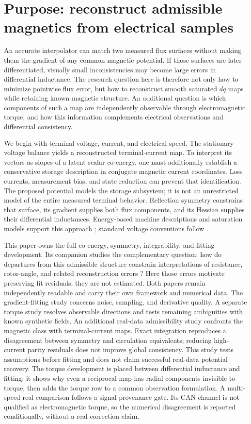 \section{Purpose: reconstruct admissible magnetics from electrical samples}
An accurate interpolator can match two measured flux surfaces without making
them the gradient of any common magnetic potential. If those surfaces are
later differentiated, visually small inconsistencies may become large errors
in differential inductance. The research question here is therefore not only
how to minimize pointwise flux error, but how to reconstruct smooth saturated
$dq$ maps while retaining known magnetic structure.
An additional question is which components of such a map are independently
observable through electromagnetic torque, and how this information
complements electrical observations and differential consistency.

We begin with terminal voltage, current, and electrical speed. The stationary
voltage balance yields a reconstructed terminal-current map. To interpret
its vectors as slopes of a latent scalar co-energy, one must additionally
establish a conservative storage description in conjugate magnetic current
coordinates. Loss currents, measurement bias, and state reduction can prevent
that identification. The proposed potential models the storage subsystem;
it is not an unrestricted model of the entire measured terminal behavior.
Reflection symmetry constrains that surface, its gradient supplies
both flux components, and its Hessian supplies their differential inductances.
Energy-based machine descriptions and saturation models support this approach
\cite{jebai2014,jebai2011}; standard voltage conventions follow
\cite{binder2017,schroeder2021}.

This paper owns the full co-energy, symmetry, integrability, and fitting
development. Its companion studies the complementary question: how do
departures from this admissible structure constrain interpretations of
resistance, rotor-angle, and related reconstruction errors
\cite{companion-diagnostics}? Here those
errors motivate preserving fit residuals; they are not estimated. Both papers
remain independently readable and carry their own framework and numerical
data. The gradient-fitting study concerns noise, sampling, and derivative
quality. A separate torque study resolves observable directions and
tests remaining ambiguities with known synthetic fields.
An additional real-data admissibility study confronts the magnetic class with
terminal-current maps. Exact integration reproduces a disagreement between
symmetry and circulation equivalents; reducing high-current parity residuals
does not improve global consistency. This study tests assumptions before
fitting and does not claim successful real-data potential recovery.
The torque development is placed between differential inductance and fitting:
it shows why even a reciprocal map has radial components invisible to torque,
then adds the torque row to a common observation formulation.
A multi-speed real comparison follows a signal-provenance gate. Its CAN
channel is not qualified as electromagnetic torque, so the numerical
disagreement is reported conditionally, without a real correction claim.

